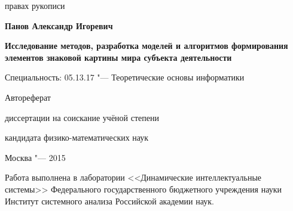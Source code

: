\newcommand{\sfs}{\fontsize{14pt}{15pt}\selectfont}
\sfs %
\thispagestyle{empty}

\vspace{10mm}
\begin{flushright}
   правах рукописи
\end{flushright}

\vspace{30mm}
\begin{center}
{\Large\bf Панов Александр Игоревич}
\end{center}

\vspace{30mm}
\begin{center}
{\bf \LARGE Исследование методов, разработка моделей и алгоритмов формирования элементов знаковой картины мира субъекта деятельности
\par}

\vspace{30mm}
{\Large
Специальность: 05.13.17 "--- Теоретические основы информатики
}

\vspace{15mm}
\LARGE Автореферат\par
\Large диссертации на соискание учёной степени\par
кандидата физико-математических наук
\end{center}

\vspace{40mm}
\begin{center}
{\Large Москва "--- 2015}
\end{center}

\newpage
\thispagestyle{empty}
\noindent Работа выполнена в лаборатории <<Динамические интеллектуальные системы>> Федерального государственного бюджетного учреждения науки Институт системного анализа Российской академии наук.

